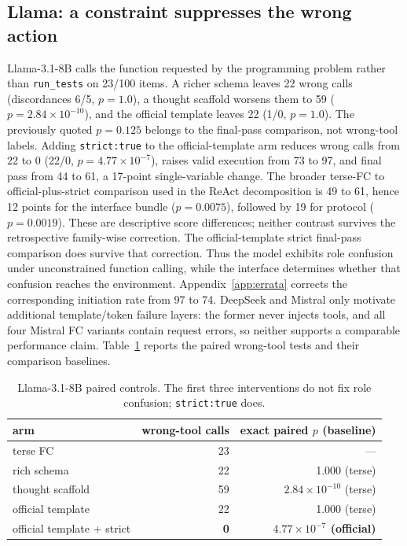 \subsection{Llama: a constraint suppresses the wrong action}
\label{sec:llama}
\label{sec:taxonomy}
\label{sec:families}

Llama-3.1-8B calls the function requested by the programming problem rather than
\texttt{run\_tests} on 23/100 items. A richer schema leaves 22 wrong calls (discordances 6/5,
$p=1.0$), a thought scaffold worsens them to 59 ($p=2.84\times10^{-10}$), and the official
template leaves 22 (1/0, $p=1.0$). The previously quoted $p=0.125$ belongs to the final-pass
comparison, not wrong-tool labels. Adding \texttt{strict:true} to the official-template arm
reduces wrong calls from 22 to 0 (22/0, $p=4.77\times10^{-7}$), raises valid execution from 73
to 97, and final pass from 44 to 61, a 17-point single-variable change. The broader terse-FC to
official-plus-strict comparison used in the ReAct decomposition is 49 to 61, hence 12 points for
the interface bundle ($p=0.0075$), followed by 19 for protocol ($p=0.0019$). These are descriptive score differences;
neither contrast survives the retrospective family-wise correction. The official-template
strict final-pass comparison does survive that correction. Thus the model exhibits
role confusion under unconstrained function calling, while the interface determines whether that
confusion reaches the environment. Appendix~\ref{app:errata} corrects the corresponding initiation
rate from 97 to 74. DeepSeek and Mistral only motivate additional template/token failure layers:
the former never injects tools, and all four Mistral FC variants contain request errors, so neither
supports a comparable performance claim.
Table~\ref{tab:llama_main} reports the paired wrong-tool tests and their comparison baselines.

\begin{table}[H]
\caption{Llama-3.1-8B paired controls. The first three interventions do not fix role confusion;
\texttt{strict:true} does.}
\label{tab:llama_main}
\centering
\small
\begin{tabular}{lrr}
\toprule
arm & wrong-tool calls & exact paired $p$ (baseline) \\
\midrule
terse FC & 23 & --- \\
rich schema & 22 & 1.000 (terse) \\
thought scaffold & 59 & $2.84\times10^{-10}$ (terse) \\
official template & 22 & 1.000 (terse) \\
official template + strict & \textbf{0} & \textbf{$4.77\times10^{-7}$ (official)} \\
\bottomrule
\end{tabular}
\end{table}

